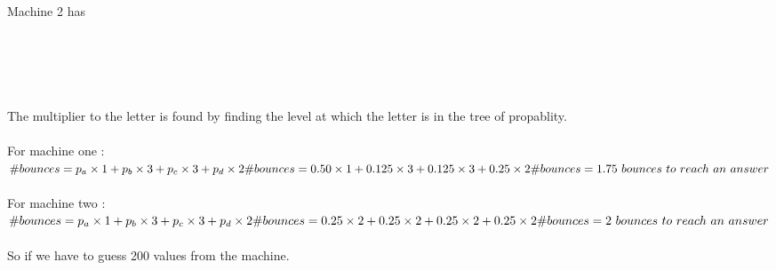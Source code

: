 \documentclass{article}
\begin{document}
    \\
    \\
    \\
    \\
    [4mm]
    Machine 2 has \\
    \\
    \\
    \\
    \\
    \\
    [4mm]
    The multiplier to the letter is found by finding the level at which the letter
    is in the tree of propablity.
    \\
    [2mm]
    \\
    For machine one :\\
    [1mm]
    \begin{math}
      \#bounces = p_a \times 1 + p_b \times 3 + p_c \times 3 + p_d \times 2\\
      \#bounces = 0.50 \times 1 + 0.125 \times 3 + 0.125 \times 3 + 0.25 \times 2\\
      \#bounces = 1.75\ bounces\ to\ reach\ an\ answer
    \end{math}
    \\
    [2mm]
    \\
    For machine two :\\
    [1mm]
    \begin{math}
      \#bounces = p_a \times 1 + p_b \times 3 + p_c \times 3 + p_d \times 2\\
      \#bounces = 0.25 \times 2 + 0.25 \times 2 + 0.25 \times 2 + 0.25 \times 2\\
      \#bounces = 2\ bounces\ to\ reach\ an\ answer
    \end{math}
    \\
    [4mm]
    \\
    So if we have to guess 200 values from the machine.\\
    [2mm]
    \\
    [1mm]
    \\
\end{document}
